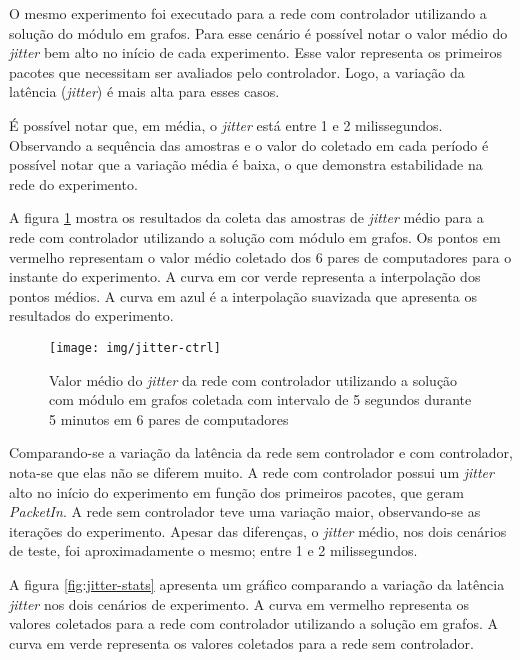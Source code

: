 O mesmo experimento foi executado para a rede com controlador utilizando a
solução do módulo em grafos.
Para esse cenário é possível notar o valor médio do \emph{jitter} bem alto
no início de cada experimento.
Esse valor representa os primeiros pacotes que necessitam ser avaliados pelo
controlador.
Logo, a variação da latência (\emph{jitter}) é mais alta para esses casos.

É possível notar que, em média, o \emph{jitter} está entre 1 e 2 milissegundos.
Observando a sequência das amostras e o valor do coletado em cada período é
possível notar que a variação média é baixa, o que demonstra estabilidade na
rede do experimento.

A figura \ref{fig:jitter-ctrl} mostra os resultados da coleta das amostras
de \emph{jitter} médio para a rede com controlador utilizando a solução com
módulo em grafos.
Os pontos em vermelho representam o valor médio coletado dos 6 pares de
computadores para o instante do experimento.
A curva em cor verde representa a interpolação dos pontos médios.
A curva em azul é a interpolação suavizada que apresenta os resultados do
experimento.

\break

\begin{figure}[!htb]
    \centering
    \label{fig:jitter-ctrl}
    \texttt{[image: img/jitter-ctrl]}
    \caption{Valor médio do \emph{jitter} da rede com controlador utilizando a
    solução com módulo em grafos coletada com intervalo de 5 segundos durante 5
    minutos em 6 pares de computadores}
\end{figure}

Comparando-se a variação da latência da rede sem controlador e com controlador,
nota-se que elas não se diferem muito.
A rede com controlador possui um \emph{jitter} alto no início do experimento
em função dos primeiros pacotes, que geram \emph{PacketIn}.
A rede sem controlador teve uma variação maior, observando-se as iterações
do experimento.
Apesar das diferenças, o \emph{jitter} médio, nos dois cenários de teste,
foi aproximadamente o mesmo; entre 1 e 2 milissegundos.

A figura \ref{fig:jitter-stats} apresenta um gráfico comparando a variação da
latência \emph{jitter} nos dois cenários de experimento.
A curva em vermelho representa os valores coletados para a rede com controlador
utilizando a solução em grafos.
A curva em verde representa os valores coletados para a rede sem controlador.

\break

